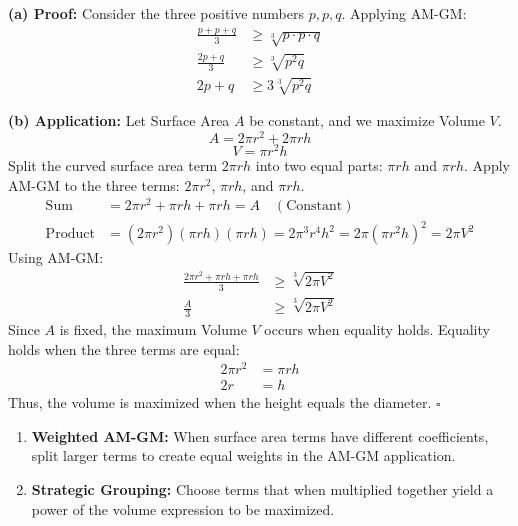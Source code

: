 \begin{solution}
\textbf{(a) Proof:}
Consider the three positive numbers $p, p, q$. Applying AM-GM:
\begin{align*}
    \frac{p + p + q}{3} &\ge \sqrt[3]{p \cdot p \cdot q} \\
    \frac{2p + q}{3} &\ge \sqrt[3]{p^2 q} \\
    2p + q &\ge 3 \sqrt[3]{p^2 q}
\end{align*}

\textbf{(b) Application:}
Let Surface Area $A$ be constant, and we maximize Volume $V$.
\[ A = 2\pi r^2 + 2\pi rh \]
\[ V = \pi r^2 h \]
Split the curved surface area term $2\pi rh$ into two equal parts: $\pi rh$ and $\pi rh$.
Apply AM-GM to the three terms: $2\pi r^2$, $\pi rh$, and $\pi rh$.
\begin{align*}
    \text{Sum} &= 2\pi r^2 + \pi rh + \pi rh = A \quad (\text{Constant}) \\
    \text{Product} &= (2\pi r^2)(\pi rh)(\pi rh) = 2\pi^3 r^4 h^2 = 2\pi (\pi r^2 h)^2 = 2\pi V^2
\end{align*}
Using AM-GM:
\begin{align*}
    \frac{2\pi r^2 + \pi rh + \pi rh}{3} &\ge \sqrt[3]{2\pi V^2} \\
    \frac{A}{3} &\ge \sqrt[3]{2\pi V^2}
\end{align*}
Since $A$ is fixed, the maximum Volume $V$ occurs when equality holds.
Equality holds when the three terms are equal:
\begin{align*}
    2\pi r^2 &= \pi rh \\
    2r &= h
\end{align*}
Thus, the volume is maximized when the height equals the diameter. \hfill $\square$
\end{solution}

\begin{takeaways}
\begin{enumerate}
    \item \textbf{Weighted AM-GM:} When surface area terms have different coefficients, split larger terms to create equal weights in the AM-GM application.
    \item \textbf{Strategic Grouping:} Choose terms that when multiplied together yield a power of the volume expression to be maximized.
\end{enumerate}
\end{takeaways}




